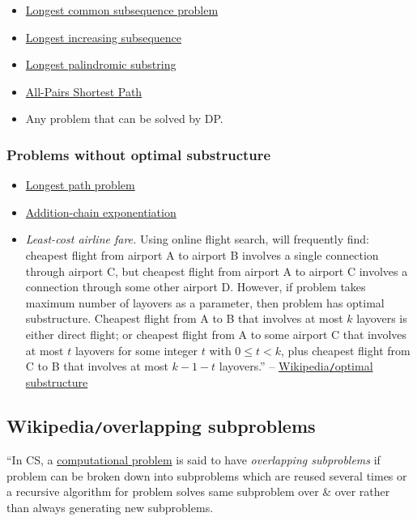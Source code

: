\documentclass{article}
\begin{document}
\begin{itemize}
	\item \href{https://en.wikipedia.org/wiki/Longest_common_subsequence_problem}{Longest common subsequence problem}
	\item \href{https://en.wikipedia.org/wiki/Longest_increasing_subsequence}{Longest increasing subsequence}
	\item \href{https://en.wikipedia.org/wiki/Longest_palindromic_substring}{Longest palindromic substring}
	\item \href{https://en.wikipedia.org/wiki/Shortest_path_problem#All-pairs_shortest_paths}{All-Pairs Shortest Path}
	\item Any problem that can be solved by DP.
\end{itemize}

\subsubsection{Problems without optimal substructure}

\begin{itemize}
	\item \href{https://en.wikipedia.org/wiki/Longest_path_problem}{Longest path problem}
	\item \href{https://en.wikipedia.org/wiki/Addition-chain_exponentiation}{Addition-chain exponentiation}
	\item {\it Least-cost airline fare.} Using online flight search, will frequently find: cheapest flight from airport A to airport B involves a single connection through airport C, but cheapest flight from airport A to airport C involves a connection through some other airport D. However, if problem takes maximum number of layovers as a parameter, then problem has optimal substructure. Cheapest flight from A to B that involves at most $k$ layovers is either direct flight; or cheapest flight from A to some airport C that involves at most $t$ layovers for some integer $t$ with $0\le t < k$, plus cheapest flight from C to B that involves at most $k - 1 - t$ layovers.'' -- \href{https://en.wikipedia.org/wiki/Optimal_substructure}{Wikipedia{\tt/}optimal substructure}
\end{itemize}


\subsection{Wikipedia{\tt/}overlapping subproblems}
``In CS, a \href{https://en.wikipedia.org/wiki/Computational_problem}{computational problem} is said to have {\it overlapping subproblems} if problem can be broken down into subproblems which are reused several times or a recursive algorithm for problem solves same subproblem over \& over rather than always generating new subproblems.
\end{document}
